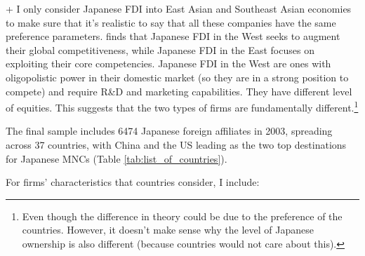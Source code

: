 + I only consider Japanese FDI into East Asian and Southeast Asian economies to
make sure that it's realistic to say that all these companies have the same
preference parameters. \citep{Pak2005} finds that Japanese FDI in the West seeks
to augment their global competitiveness, while Japanese FDI in the East focuses
on exploiting their core competencies. Japanese FDI in the West are ones with
oligopolistic power in their domestic market (so they are in a strong position
to compete) and require R\&D and marketing capabilities. They have different
level of equities. This suggests that the two types of firms are fundamentally
different.\footnote{Even though the difference in theory could be due to the
preference of the countries. However, it doesn't make sense why the level of
Japanese ownership is also different (because countries would not care about
this).}

The final sample includes 6474 Japanese foreign affiliates in 2003, spreading
across 37 countries, with China and the US leading as the two top destinations
for Japanese MNCs (Table \ref{tab:list_of_countries}).

For firms' characteristics that countries consider, I include:

